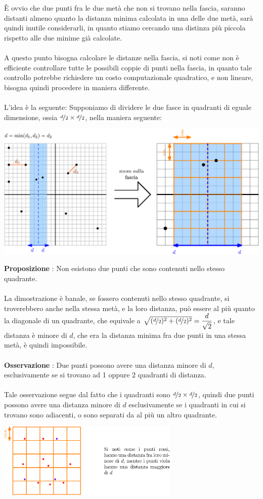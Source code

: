 \documentclass[12pt, letterpaper]{article}
\newcommand{\acc}{\\\hphantom{}\\}
\begin{document}
È ovvio che due punti fra le due metà che non si trovano nella fascia, saranno distanti almeno quanto la distanza minima
calcolata in una delle due metà, sarà quindi inutile considerarli, in quanto stiamo cercando una distinza più piccola
rispetto alle due minime già calcolate.\acc
A questo punto bisogna calcolare le distanze nella fascia, si noti come non è efficiente controllare tutte le possibili coppie
di punti nella fascia, in quanto tale controllo potrebbe richiedere un costo computazionale quadratico, e non lineare,
bisogna quindi procedere in maniera differente.\acc
L'idea è la seguente: Supponiamo di dividere le due fasce in quadranti di eguale dimensione, ossia
$\nicefrac{d}{2}\times \nicefrac{d}{2}$, nella maniera seguente:\begin{center}
    \includegraphics[width=1\textwidth ]{images/distMin2.eps}
\end{center}
\textbf{Proposizione} : Non esistono due punti che sono contenuti nello stesso quadrante.\acc
La dimostrazione è banale, se fossero contenuti nello stesso quadrante, si troverebbero anche nella
stessa metà, e la loro distanza, può essere al più quanto la diagonale di un quadrante, che equivale
a $\sqrt{(\nicefrac{d}{2})^2+(\nicefrac{d}{2})^2}=\dfrac{d}{\sqrt{2}}$, e tale distanza è minore di $d$, che era la
distanza minima fra due punti in una stessa metà, è quindi impossibile.\acc
\textbf{Osservazione} : Due punti possono avere una distanza minore di $d$, esclusivamente se si trovano ad 1 oppure 2
quadranti di distanza.\acc
Tale osservazione segue dal fatto che i quadranti sono  $\nicefrac{d}{2}\times \nicefrac{d}{2}$, quindi due punti possono
avere una distanza minore di $d$ esclusivamente se i quadranti in cui si trovano sono adiacenti, o sono separati da
al più un altro quadrante.\begin{center}
    \includegraphics[width=0.65\textwidth ]{images/distMin3.eps}
\end{center}
\end{document}
